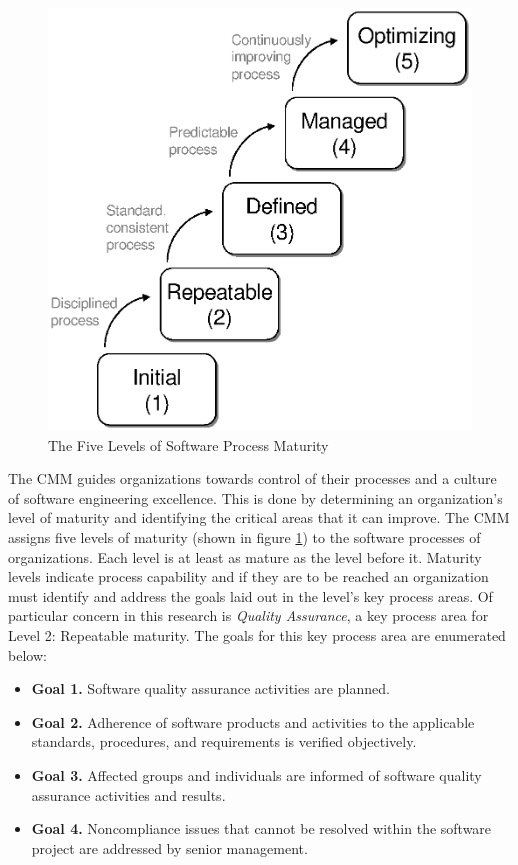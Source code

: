 \begin{figure}[t]
\begin{center}
\includegraphics{figures/CMMMaturityLevels.eps}
\end{center}
\caption{The Five Levels of Software Process Maturity}
\label{fig:cmm-levels}
\end{figure}

The CMM guides organizations towards control of their processes and a culture of
software engineering excellence. This is done by determining an organization's
level of maturity and identifying the critical areas that it can improve. The
CMM assigns five levels of maturity (shown in figure \ref{fig:cmm-levels}) to
the software processes of organizations. Each level is at least as mature as the
level before it. Maturity levels indicate process capability and if they are to
be reached an organization must identify and address the goals laid out in the
level's key process areas. Of particular concern in this research is
\textit{Quality Assurance}, a key process area for Level 2: Repeatable maturity.
The goals for this key process area are enumerated below: \singlespace
\begin{itemize}
  \item \textbf{Goal 1.} Software quality assurance activities are planned.
  \item \textbf{Goal 2.} Adherence of software products and activities to the
        applicable standards, procedures, and requirements is verified
        objectively.
  \item \textbf{Goal 3.} Affected groups and individuals are informed of
        software quality assurance activities and results.
  \item \textbf{Goal 4.} Noncompliance issues that cannot be resolved within
        the software project are addressed by senior management.
\end{itemize}
\doublespace

